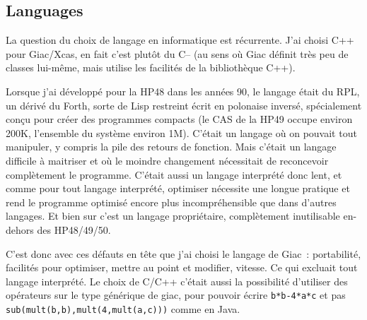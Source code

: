 \documentclass[a4paper,11pt]{book}
\begin{document}
\begin{giacjshere}
\section{Languages}
La question du choix de langage en informatique est r\'ecurrente.
J'ai choisi C++ pour Giac/Xcas, en fait c'est plut\^ot du C-- (au
sens o\`u Giac d\'efinit tr\`es peu de classes lui-m\^eme, mais
utilise les facilit\'es de la biblioth\`eque C++).

Lorsque j'ai d\'evelopp\'e pour la HP48 dans les ann\'ees 90, le langage
\'etait du RPL, un d\'eriv\'e du Forth, sorte de Lisp restreint \'ecrit
en polonaise invers\'e, sp\'ecialement con\c{c}u pour cr\'eer
des programmes compacts (le CAS de la HP49 occupe environ
200K, l'ensemble du syst\`eme environ 1M).
C'\'etait un langage o\`u on pouvait
tout manipuler, y compris la pile des retours de fonction.
Mais c'\'etait un langage difficile \`a maitriser et o\`u le
moindre changement n\'ecessitait de reconcevoir compl\`etement
le programme. C'\'etait aussi un langage interpr\'et\'e donc lent,
et comme pour tout langage interpr\'et\'e, optimiser n\'ecessite
une longue pratique et rend le programme optimis\'e encore plus
incompr\'ehensible que dans d'autres langages.
Et bien sur c'est un langage propri\'etaire, compl\`etement
inutilisable en-dehors des HP48/49/50.

C'est donc avec ces d\'efauts en t\^ete que j'ai choisi le
langage de Giac~: portabilit\'e, facilit\'es pour optimiser,
mettre au point et modifier, vitesse. Ce qui excluait
tout langage interpr\'et\'e. Le choix
de C/C++ c'\'etait aussi la possibilit\'e d'utiliser des op\'erateurs
sur le type g\'en\'erique de giac, pour pouvoir \'ecrire
\verb|b*b-4*a*c| et pas \verb|sub(mult(b,b),mult(4,mult(a,c)))|
comme en Java.


\end{giacjshere}
\end{document}
